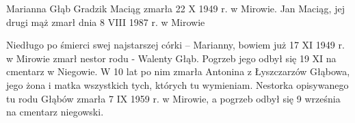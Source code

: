 Marianna Głąb Gradzik Maciąg zmarła 22 X 1949 r. w Mirowie. Jan Maciąg, jej drugi mąż zmarł dnia 8 VIII 1987 r. w Mirowie

Niedługo po śmierci swej najstarszej córki -- Marianny, bowiem już 17 XI 1949 r. w Mirowie zmarł nestor rodu - Walenty Głąb. Pogrzeb jego odbył się 19 XI na cmentarz w Niegowie. W 10 lat po nim zmarła Antonina z Łyszczarzów Głąbowa, jego żona i matka wszystkich tych, których tu wymieniam. Nestorka opisywanego tu rodu Głąbów zmarła 7 IX 1959 r. w Mirowie, a pogrzeb odbył się 9 września na cmentarz niegowski.
